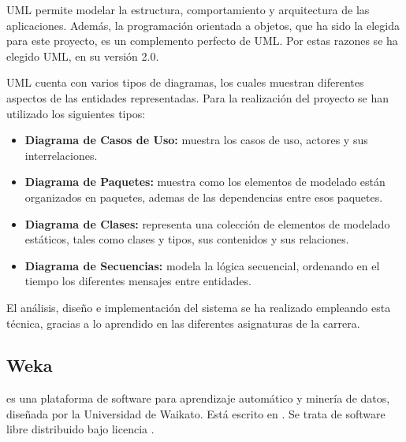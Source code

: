 UML permite modelar la estructura, comportamiento y arquitectura de las aplicaciones. Además, la programación orientada a objetos, que ha sido la elegida para este proyecto, es un complemento perfecto de UML. Por estas razones se ha elegido UML, en su versión 2.0.

UML cuenta con varios tipos de diagramas, los cuales muestran diferentes aspectos de las entidades
representadas. Para la realización del proyecto se han utilizado los siguientes tipos:

\begin{itemize}
\item \textbf{Diagrama de Casos de Uso:} muestra los casos de uso, actores y sus interrelaciones.
\item \textbf{Diagrama de Paquetes:} muestra como los elementos de modelado están organizados en
paquetes, ademas de las dependencias entre esos paquetes.
\item \textbf{Diagrama de Clases:} representa una colección de elementos de modelado estáticos, tales
como clases y tipos, sus contenidos y sus relaciones.
\item \textbf{Diagrama de Secuencias:} modela la lógica secuencial, ordenando en el tiempo los diferentes
mensajes entre entidades.
\end{itemize}

El análisis, diseño e implementación del sistema se ha realizado empleando esta técnica, gracias a lo aprendido en las diferentes asignaturas de la carrera.


\subsection{Weka}
\weka{} es una plataforma de software para aprendizaje automático y minería de datos, diseñada por la Universidad de Waikato. Está escrito en \java{}. Se trata de software libre distribuido bajo licencia \gnu{}.

